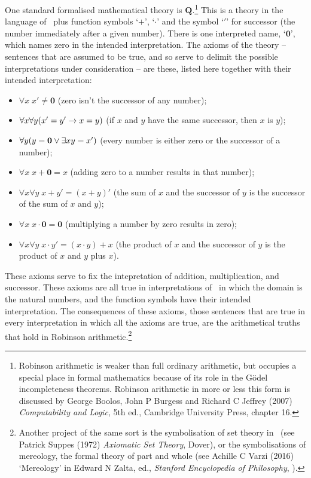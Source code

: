 One standard formalised mathematical theory is  $\mathbf{Q}$.\footnote{Robinson arithmetic is weaker than full ordinary arithmetic, but occupies a special place in formal mathematics because of its role in the Gödel incompleteness theorems. Robinson arithmetic in more or less this form is discussed by George Boolos, John P Burgess and Richard C Jeffrey (2007) \emph{Computability and Logic}, 5th ed., Cambridge University Press, chapter 16.} This is a theory in the language of \FOL\ plus function symbols `$+$', `$\cdot$' and the symbol `$'$' for successor (the number immediately after a given number). There is one interpreted name, `$\mathbf{0}$', which names zero in the intended interpretation.
The axioms of the theory – sentences that are assumed to be true, and so serve to delimit the possible interpretations under consideration – are these, listed here together with their intended interpretation:
\begin{itemize}
	\item $\forall x\; x' \neq \mathbf{0}$ (zero isn't the successor of any number);
	\item $\forall x \forall y (x' = y' \rightarrow x = y)$ (if $x$ and $y$ have the same successor, then $x$ is $y$);
	\item $\forall y (y = \mathbf{0} \vee \exists x y = x')$ (every number is either zero or the successor of a number);
	\item $\forall x\; x + \mathbf{0} = x$ (adding zero to a number results in that number);
	\item $\forall x \forall y\; x + y' = (x + y)'$ (the sum of $x$ and the successor of $y$ is the successor of the sum of $x$ and $y$);
	\item $\forall x\; x\cdot\mathbf{0} = \mathbf{0}$ (multiplying a number by zero results in zero);
	\item $\forall x \forall y\; x\cdot y' = (x\cdot y) + x$ (the product of $x$ and the successor of $y$ is the product of $x$ and $y$ plus $x$).
\end{itemize} These axioms serve to fix the intepretation of addition, multiplication, and successor. These axioms are all true in interpretations of \FOL\ in which the domain is the natural numbers, and the function symbols have their intended interpretation. The consequences of these axioms, those sentences that are true in every interpretation in which all the axioms are true, are the arithmetical truths that hold in Robinson arithmetic.\footnote{Another project of the same sort is the symbolisation of set theory in \FOL\ (see Patrick Suppes (1972) \emph{Axiomatic Set Theory}, Dover), or the symbolisations of mereology, the formal theory of part and whole (see Achille C Varzi (2016) `Mereology' in Edward N Zalta, ed., \emph{Stanford Encyclopedia of Philosophy}, ).}

